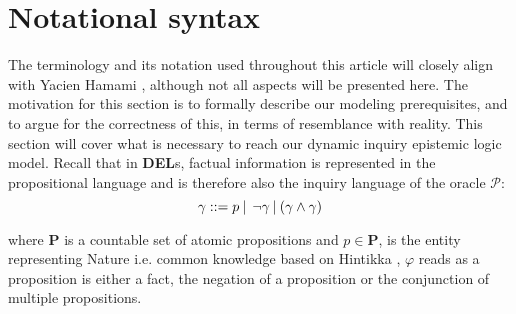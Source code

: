\section{Notational syntax}
The terminology and its notation used throughout this article will closely
align with Yacien Hamami \cite{delimi}, although not all aspects will be
presented here. The motivation for this section is to formally describe our
modeling prerequisites, and to argue for the correctness of this, in terms of
resemblance with reality. This section will cover what is necessary to reach
our dynamic inquiry epistemic logic model. Recall that in \textbf{DEL}s,
factual information is represented in the propositional language and is
therefore also the inquiry language of the oracle $\mathscr{P}$: $$ \gamma::= p
	\:|\:\:\neg\gamma\:|\:(\gamma\land\gamma) $$

where \textbf{P} is a countable set of atomic propositions and $p \in
	\mathbf{P}$, \oracle is the entity representing Nature i.e. common knowledge
based on Hintikka \cite{hintikka88}, $\varphi$ reads as a proposition is either
a fact, the negation of a proposition or the conjunction of multiple
propositions.

